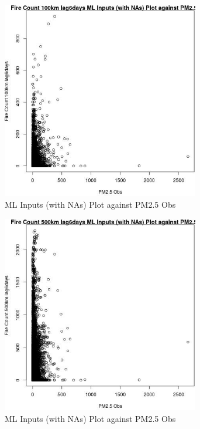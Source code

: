 \begin{figure} 
\centering  
\includegraphics[width=0.77\textwidth]{Code_Outputs/Report_ML_input_PM25_Step4_part_e_de_duplicated_aves_compiled_2019-05-20wNAs_Fire_Count_100km_lag6daysvPM25_Obs.jpg} 
\caption{\label{fig:Report_ML_input_PM25_Step4_part_e_de_duplicated_aves_compiled_2019-05-20wNAsFire_Count_100km_lag6daysvPM25_Obs}ML Inputs (with NAs) Plot against PM2.5 Obs} 
\end{figure} 
 

\begin{figure} 
\centering  
\includegraphics[width=0.77\textwidth]{Code_Outputs/Report_ML_input_PM25_Step4_part_e_de_duplicated_aves_compiled_2019-05-20wNAs_Fire_Count_500km_lag6daysvPM25_Obs.jpg} 
\caption{\label{fig:Report_ML_input_PM25_Step4_part_e_de_duplicated_aves_compiled_2019-05-20wNAsFire_Count_500km_lag6daysvPM25_Obs}ML Inputs (with NAs) Plot against PM2.5 Obs} 
\end{figure} 
 

